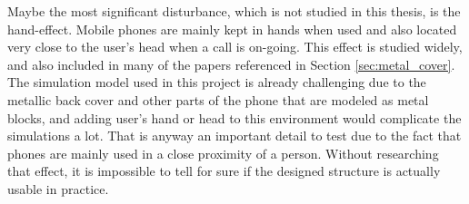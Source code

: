 Maybe the most significant disturbance, which is not studied in this thesis, is the hand-effect. Mobile phones are mainly kept in hands when used and also located very close to the user's head when a call is on-going. This effect is studied widely, and also included in many of the papers referenced in Section \ref{sec:metal_cover}. The simulation model used in this project is already challenging due to the metallic back cover and other parts of the phone that are modeled as metal blocks, and adding user's hand or head to this environment would complicate the simulations a lot. That is anyway an important detail to test due to the fact that phones are mainly used in a close proximity of a person. Without researching that effect, it is impossible to tell for sure if the designed structure is actually usable in practice.


\clearpage